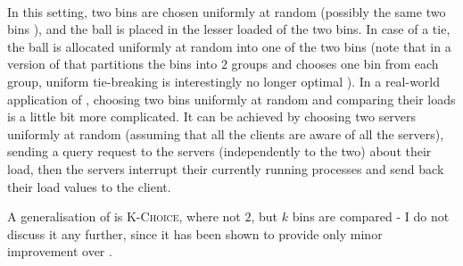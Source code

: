 \paragraph{\TwoChoice}
In this setting, two bins are chosen uniformly at random (possibly the same two bins ), and the ball is placed in the lesser loaded of the two bins. In case of a tie, the ball is allocated uniformly at random into one of the two bins  (note that in a version of \TwoChoice that partitions the bins into $2$ groups and chooses one bin from each group, uniform tie-breaking is interestingly no longer optimal \cite{vocking2003tiebreaking}). In a real-world application of \TwoChoice, choosing two bins uniformly at random and comparing their loads is a little bit more complicated. It can be achieved by choosing two servers uniformly at random (assuming that all the clients are aware of all the servers), sending a query request to the servers (independently to the two) about their load, then the servers interrupt their currently running processes and send back their load values to the client.

A generalisation of \TwoChoice is \textsc{K-Choice}, where not $2$, but $k$ bins are compared - I do not discuss it any further, since it has been shown to provide only minor improvement  over \TwoChoice \cite{azar1999twochoice}.


\paragraph{\TwoThinning}

